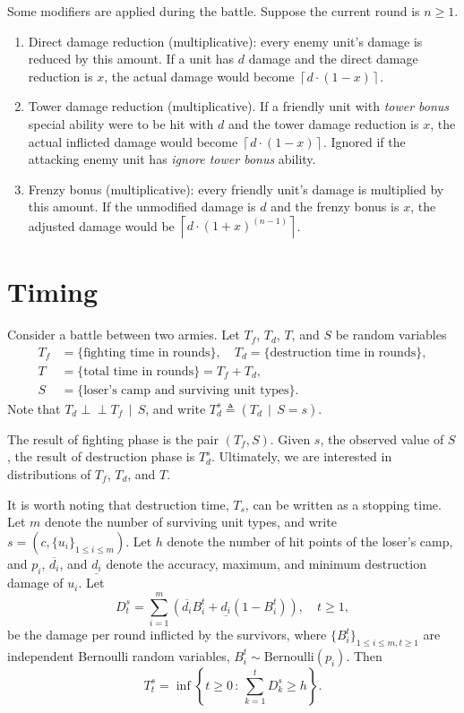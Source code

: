 \documentclass{article}
\newcommand{\ignore}[1]{}
\newcommand{\ceil}[1]{\left\lceil #1 \right\rceil}
\newcommand{\cond}[2]{\left. {#1} \, \middle | \, {#2} \right.}
\newcommand{\ci}{\perp\!\!\!\perp}             %
\renewcommand{\le}{\leqslant}
\renewcommand{\ge}{\geqslant}
\renewcommand{\geq}{\geqslant}
\numberwithin{equation}{section}
\begin{document}
Some modifiers are applied during the battle. Suppose the current round is $n \geq 1$.
\begin{enumerate}
    \item Direct damage reduction (multiplicative): every enemy unit's damage is reduced by this amount. If a unit has $d$ damage and the direct damage reduction is $x$, the actual damage would become $\ceil{d \cdot (1 - x)}$.
    \item Tower damage reduction (multiplicative). If a friendly unit with \emph{tower bonus} special ability were to be hit with $d$ and the tower damage reduction is $x$, the actual inflicted damage would become $\ceil{d \cdot (1 - x)}$. Ignored if the attacking enemy unit has \emph{ignore tower bonus} ability.
    \item Frenzy bonus (multiplicative): every friendly unit's damage is multiplied by this amount. If the unmodified damage is $d$ and the frenzy bonus is $x$, the adjusted damage would be $\ceil{d \cdot (1 + x)^{(n - 1)}}$.
\end{enumerate}

\section{Timing}

Consider a battle between two armies\ignore{ $A_1$ and $A_2$}.
Let $T_f$, $T_d$, $T$, and $S$ be random variables
\begin{align*}
    T_f &= \{ \text{fighting time in rounds} \}, \quad
    T_d = \{ \text{destruction time in rounds} \}, \\
    T &= \{ \text{total time in rounds} \} = T_f + T_d, \\
    S &= \{ \text{loser's camp and surviving unit types} \}.
\end{align*}
%
Note that $\cond{T_d \ci T_f}{S}$, and write $T_d^s \triangleq (\cond{T_d}{S = s})$.

The result of fighting phase is the pair $(T_f, S)$. Given $s$, the observed value of $S$, the result of destruction phase is $T_d^s$.
Ultimately, we are interested in distributions of $T_f$, $T_d$, and $T$.


It is worth noting that destruction time, $T_s$, can be written as a stopping time. Let $m$ denote the number of surviving unit types, and write $s = \left( c, \{ u_i \} _{1 \le i \le m} \right)$. Let $h$ denote the number of hit points of the loser's camp, and $p_i$, $\overline{d_i}$, and $\underline{d_i}$ denote the accuracy, maximum, and minimum destruction damage of $u_i$. Let
\[
    D_t^s = \sum _{i = 1}^{m} \left( \overline{d_i} B_i^t + \underline{d_i} (1 - B_i^t) \right), \quad t \ge 1, \ignore{\quad D_0^s = 0,}
\]
be the damage per round inflicted by the survivors, where $\{ B_i^t \} _{1 \le i \le m, t \ge 1}$ are independent Bernoulli random variables, $B_i^t \sim \mathrm{Bernoulli}(p_i)$. Then
\[
    T_t^s = \inf \left\{ t \ge 0  \,:\, \sum _{k = 1}^t D_k^s \ge h \right\}.
\]
\end{document}
